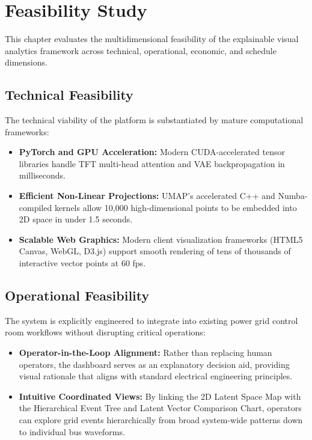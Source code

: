 \documentclass[12pt,a4paper]{report}
\begin{document}
\chapter{Feasibility Study}

This chapter evaluates the multidimensional feasibility of the explainable visual analytics framework across technical, operational, economic, and schedule dimensions.

\section{Technical Feasibility}
The technical viability of the platform is substantiated by mature computational frameworks:
\begin{itemize}
    \item \textbf{PyTorch and GPU Acceleration:} Modern CUDA-accelerated tensor libraries handle TFT multi-head attention and VAE backpropagation in milliseconds.
    \item \textbf{Efficient Non-Linear Projections:} UMAP's accelerated C++ and Numba-compiled kernels allow 10,000 high-dimensional points to be embedded into 2D space in under 1.5 seconds.
    \item \textbf{Scalable Web Graphics:} Modern client visualization frameworks (HTML5 Canvas, WebGL, D3.js) support smooth rendering of tens of thousands of interactive vector points at 60 fps.
\end{itemize}

\section{Operational Feasibility}
The system is explicitly engineered to integrate into existing power grid control room workflows without disrupting critical operations:
\begin{itemize}
    \item \textbf{Operator-in-the-Loop Alignment:} Rather than replacing human operators, the dashboard serves as an explanatory decision aid, providing visual rationale that aligns with standard electrical engineering principles.
    \item \textbf{Intuitive Coordinated Views:} By linking the 2D Latent Space Map with the Hierarchical Event Tree and Latent Vector Comparison Chart, operators can explore grid events hierarchically from broad system-wide patterns down to individual bus waveforms.
\end{itemize}
\end{document}
